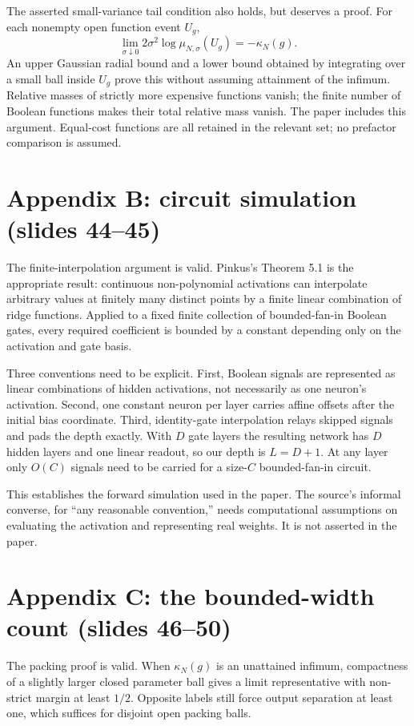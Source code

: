 \documentclass[11pt]{article}
\begin{document}
The asserted small-variance tail condition also holds, but deserves a proof. For each nonempty open function event $U_g$,
\[
 \lim_{\sigma\downarrow0}2\sigma^2\log\mu_{N,\sigma}(U_g)=-\kappa_N(g).
\]
An upper Gaussian radial bound and a lower bound obtained by integrating over a small ball inside $U_g$ prove this without assuming attainment of the infimum. Relative masses of strictly more expensive functions vanish; the finite number of Boolean functions makes their total relative mass vanish. The paper includes this argument. Equal-cost functions are all retained in the relevant set; no prefactor comparison is assumed.

\section{Appendix B: circuit simulation (slides 44--45)}
The finite-interpolation argument is valid. Pinkus's Theorem 5.1 is the appropriate result: continuous non-polynomial activations can interpolate arbitrary values at finitely many distinct points by a finite linear combination of ridge functions. Applied to a fixed finite collection of bounded-fan-in Boolean gates, every required coefficient is bounded by a constant depending only on the activation and gate basis.

Three conventions need to be explicit. First, Boolean signals are represented as linear combinations of hidden activations, not necessarily as one neuron's activation. Second, one constant neuron per layer carries affine offsets after the initial bias coordinate. Third, identity-gate interpolation relays skipped signals and pads the depth exactly. With $D$ gate layers the resulting network has $D$ hidden layers and one linear readout, so our depth is $L=D+1$. At any layer only $O(C)$ signals need to be carried for a size-$C$ bounded-fan-in circuit.

This establishes the forward simulation used in the paper. The source's informal converse, for ``any reasonable convention,'' needs computational assumptions on evaluating the activation and representing real weights. It is not asserted in the paper.

\section{Appendix C: the bounded-width count (slides 46--50)}
The packing proof is valid. When $\kappa_N(g)$ is an unattained infimum, compactness of a slightly larger closed parameter ball gives a limit representative with non-strict margin at least $1/2$. Opposite labels still force output separation at least one, which suffices for disjoint open packing balls.
\end{document}
